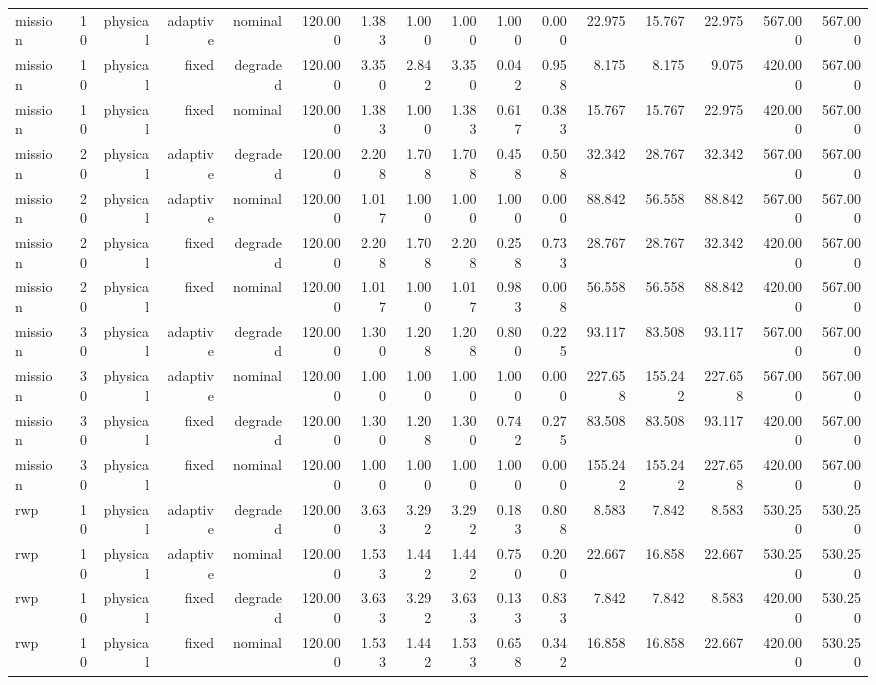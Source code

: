 \begin{tabular}{lrrrrrrrrrrrrrrr}
mission & 10 & physical & adaptive & nominal & 120.000 & 1.383 & 1.000 & 1.000 & 1.000 & 0.000 & 22.975 & 15.767 & 22.975 & 567.000 & 567.000 \\
mission & 10 & physical & fixed & degraded & 120.000 & 3.350 & 2.842 & 3.350 & 0.042 & 0.958 & 8.175 & 8.175 & 9.075 & 420.000 & 567.000 \\
mission & 10 & physical & fixed & nominal & 120.000 & 1.383 & 1.000 & 1.383 & 0.617 & 0.383 & 15.767 & 15.767 & 22.975 & 420.000 & 567.000 \\
mission & 20 & physical & adaptive & degraded & 120.000 & 2.208 & 1.708 & 1.708 & 0.458 & 0.508 & 32.342 & 28.767 & 32.342 & 567.000 & 567.000 \\
mission & 20 & physical & adaptive & nominal & 120.000 & 1.017 & 1.000 & 1.000 & 1.000 & 0.000 & 88.842 & 56.558 & 88.842 & 567.000 & 567.000 \\
mission & 20 & physical & fixed & degraded & 120.000 & 2.208 & 1.708 & 2.208 & 0.258 & 0.733 & 28.767 & 28.767 & 32.342 & 420.000 & 567.000 \\
mission & 20 & physical & fixed & nominal & 120.000 & 1.017 & 1.000 & 1.017 & 0.983 & 0.008 & 56.558 & 56.558 & 88.842 & 420.000 & 567.000 \\
mission & 30 & physical & adaptive & degraded & 120.000 & 1.300 & 1.208 & 1.208 & 0.800 & 0.225 & 93.117 & 83.508 & 93.117 & 567.000 & 567.000 \\
mission & 30 & physical & adaptive & nominal & 120.000 & 1.000 & 1.000 & 1.000 & 1.000 & 0.000 & 227.658 & 155.242 & 227.658 & 567.000 & 567.000 \\
mission & 30 & physical & fixed & degraded & 120.000 & 1.300 & 1.208 & 1.300 & 0.742 & 0.275 & 83.508 & 83.508 & 93.117 & 420.000 & 567.000 \\
mission & 30 & physical & fixed & nominal & 120.000 & 1.000 & 1.000 & 1.000 & 1.000 & 0.000 & 155.242 & 155.242 & 227.658 & 420.000 & 567.000 \\
rwp & 10 & physical & adaptive & degraded & 120.000 & 3.633 & 3.292 & 3.292 & 0.183 & 0.808 & 8.583 & 7.842 & 8.583 & 530.250 & 530.250 \\
rwp & 10 & physical & adaptive & nominal & 120.000 & 1.533 & 1.442 & 1.442 & 0.750 & 0.200 & 22.667 & 16.858 & 22.667 & 530.250 & 530.250 \\
rwp & 10 & physical & fixed & degraded & 120.000 & 3.633 & 3.292 & 3.633 & 0.133 & 0.833 & 7.842 & 7.842 & 8.583 & 420.000 & 530.250 \\
rwp & 10 & physical & fixed & nominal & 120.000 & 1.533 & 1.442 & 1.533 & 0.658 & 0.342 & 16.858 & 16.858 & 22.667 & 420.000 & 530.250 \\

\end{tabular}
